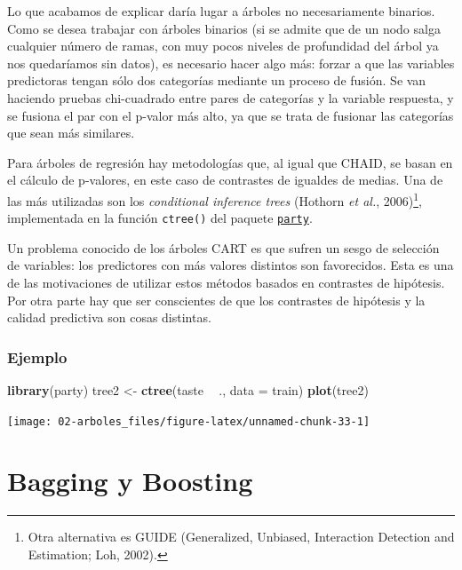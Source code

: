 \documentclass[]{book}
\newenvironment{Shaded}{\begin{snugshade}}{\end{snugshade}}
\newcommand{\KeywordTok}[1]{\textcolor[rgb]{0.13,0.29,0.53}{\textbf{#1}}}
\newcommand{\DataTypeTok}[1]{\textcolor[rgb]{0.13,0.29,0.53}{#1}}
\newcommand{\StringTok}[1]{\textcolor[rgb]{0.31,0.60,0.02}{#1}}
\newcommand{\OperatorTok}[1]{\textcolor[rgb]{0.81,0.36,0.00}{\textbf{#1}}}
\newcommand{\NormalTok}[1]{#1}
\theoremstyle{break}
\theoremstyle{definition}
\theoremstyle{definition}
\theoremstyle{definition}
\theoremstyle{remark}
\begin{document}
Lo que acabamos de explicar daría lugar a árboles no necesariamente
binarios. Como se desea trabajar con árboles binarios (si se admite que
de un nodo salga cualquier número de ramas, con muy pocos niveles de
profundidad del árbol ya nos quedaríamos sin datos), es necesario hacer
algo más: forzar a que las variables predictoras tengan sólo dos
categorías mediante un proceso de fusión. Se van haciendo pruebas
chi-cuadrado entre pares de categorías y la variable respuesta, y se
fusiona el par con el p-valor más alto, ya que se trata de fusionar las
categorías que sean más similares.

Para árboles de regresión hay metodologías que, al igual que CHAID, se
basan en el cálculo de p-valores, en este caso de contrastes de igualdes
de medias. Una de las más utilizadas son los \emph{conditional inference
trees} (Hothorn \emph{et al.}, 2006)\footnote{Otra alternativa es GUIDE
  (Generalized, Unbiased, Interaction Detection and Estimation; Loh,
  2002).}, implementada en la función \texttt{ctree()} del paquete
\href{https://CRAN.R-project.org/package=party}{\texttt{party}}.

Un problema conocido de los árboles CART es que sufren un sesgo de
selección de variables: los predictores con más valores distintos son
favorecidos. Esta es una de las motivaciones de utilizar estos métodos
basados en contrastes de hipótesis. Por otra parte hay que ser
conscientes de que los contrastes de hipótesis y la calidad predictiva
son cosas distintas.

\subsection{Ejemplo}\label{ejemplo}

\begin{Shaded}
\begin{Highlighting}[]
\KeywordTok{library}\NormalTok{(party)}
\NormalTok{tree2 <-}\StringTok{ }\KeywordTok{ctree}\NormalTok{(taste }\OperatorTok{~}\StringTok{ }\NormalTok{., }\DataTypeTok{data =}\NormalTok{ train) }
\KeywordTok{plot}\NormalTok{(tree2)}
\end{Highlighting}
\end{Shaded}

\begin{center}\texttt{[image: 02-arboles\_files/figure-latex/unnamed-chunk-33-1]} \end{center}

\chapter{Bagging y Boosting}\label{bagging-boosting}
\end{document}
